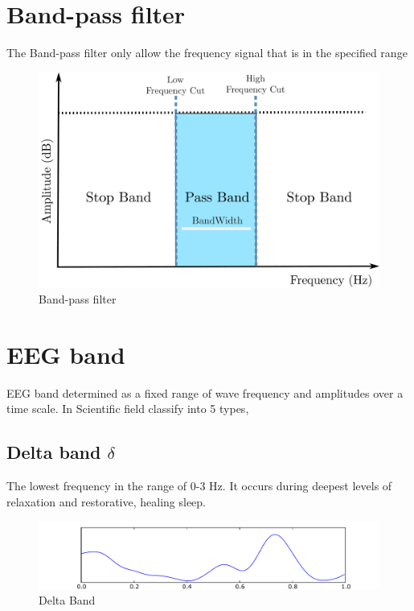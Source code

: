 \section{Band-pass filter}
\hspace{1.5cm}The Band-pass filter only allow the frequency signal that is in the specified range
\begin{figure}[ht]
	\centering
	\includegraphics[scale = 0.14]{chapter3/bandpass.pdf}
	\caption{Band-pass filter}
\end{figure}

\section{EEG band \cite{eegband}}
\hspace{1.5cm}EEG band determined as a fixed range of wave frequency and amplitudes over a time scale. In Scientific field classify into 5 types,

\subsection{Delta band $\delta$} 
\hspace{1.5cm} The lowest frequency in the range of 0-3 Hz. It occurs during deepest levels of relaxation and restorative, healing sleep.
\begin{figure}[ht]
	\centering
	\includegraphics[scale = 0.5]{chapter3/Eeg_delta.pdf}
	\caption{Delta Band}
\end{figure}

